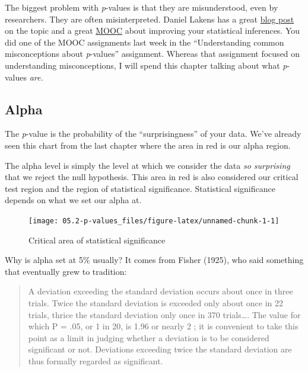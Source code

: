 \documentclass[
]{book}
\begin{document}
The biggest problem with \emph{p}-values is that they are misunderstood, even by researchers. They are often misinterpreted. Daniel Lakens has a great \href{http://daniellakens.blogspot.com/2017/12/understanding-common-misconceptions.html}{blog post} on the topic and a great \href{https://www.coursera.org/learn/statistical-inferences}{MOOC} about improving your statistical inferences. You did one of the MOOC assignments last week in the ``Understanding common misconceptions about \emph{p}-values'' assignment. Whereas that assignment focused on understanding misconceptions, I will spend this chapter talking about what \emph{p}-values \emph{are.}

\hypertarget{alpha}{%
\subsection{Alpha}\label{alpha}}

The \emph{p}-value is the probability of the ``surprisingness'' of your data. We've already seen this chart from the last chapter where the area in red is our alpha region.

The alpha level is simply the level at which we consider the data \emph{so surprising} that we reject the null hypothesis. This area in red is also considered our critical test region and the region of statistical significance. Statistical significance depends on what we set our alpha at.

\begin{figure}

{\centering \texttt{[image: 05.2-p-values\_files/figure-latex/unnamed-chunk-1-1]} 

}

\caption{Critical area of statistical significance}\label{fig:unnamed-chunk-1}
\end{figure}

Why is alpha set at 5\% usually? It comes from Fisher (1925), who said something that eventually grew to tradition:

\begin{quote}
A deviation exceeding the standard deviation occurs about once in three trials. Twice the standard deviation is exceeded only about once in 22 trials, thrice the standard deviation only once in 370 trials\ldots. The value for which P = .05, or 1 in 20, is 1.96 or nearly 2 ; it is convenient to take this point as a limit in judging whether a deviation is to be considered significant or not. Deviations exceeding twice the standard deviation are thus formally regarded as significant.
\end{quote}
\end{document}
